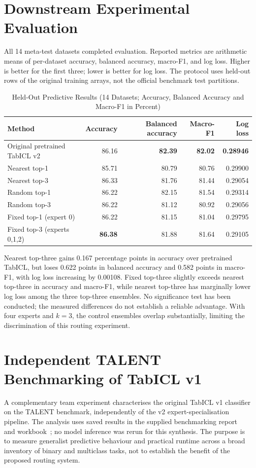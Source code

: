 \documentclass[conference]{IEEEtran}
\begin{document}
\section{Downstream Experimental Evaluation}
All 14 meta-test datasets completed evaluation. Reported metrics are arithmetic means of per-dataset accuracy, balanced accuracy, macro-F1, and log loss. Higher is better for the first three; lower is better for log loss. The protocol uses held-out rows of the original training arrays, not the official benchmark test partitions.
\begin{table}[t]
\caption{Held-Out Predictive Results (14 Datasets; Accuracy, Balanced Accuracy and Macro-F1 in Percent)}
\label{tab:results}
\centering\small
\begin{tabular}{lrrrr}\toprule
Method & Accuracy & Balanced accuracy & Macro-F1 & Log loss\\\midrule
Original pretrained TabICL v2 & 86.16 & \textbf{82.39} & \textbf{82.02} & \textbf{0.28946}\\
Nearest top-1 & 85.71 & 80.79 & 80.76 & 0.29900\\
Nearest top-3 & 86.33 & 81.76 & 81.44 & 0.29054\\
Random top-1 & 86.22 & 82.15 & 81.54 & 0.29314\\
Random top-3 & 86.22 & 81.12 & 80.92 & 0.29056\\
Fixed top-1 (expert 0) & 86.22 & 81.15 & 81.04 & 0.29795\\
Fixed top-3 (experts 0,1,2) & \textbf{86.38} & 81.88 & 81.64 & 0.29105\\\bottomrule
\end{tabular}
\end{table}
Nearest top-three gains 0.167 percentage points in accuracy over pretrained TabICL, but loses 0.622 points in balanced accuracy and 0.582 points in macro-F1, with log loss increasing by 0.00108. Fixed top-three slightly exceeds nearest top-three in accuracy and macro-F1, while nearest top-three has marginally lower log loss among the three top-three ensembles. No significance test has been conducted; the measured differences do not establish a reliable advantage. With four experts and $k=3$, the control ensembles overlap substantially, limiting the discrimination of this routing experiment.

\section{Independent TALENT Benchmarking of TabICL v1}
\label{sec:talent}
A complementary team experiment characterises the original TabICL v1 classifier on the TALENT benchmark, independently of the v2 expert-specialisation pipeline. The analysis uses saved results in the supplied benchmarking report~\cite{talentreport} and workbook~\cite{talentworkbook}; no model inference was rerun for this synthesis. The purpose is to measure generalist predictive behaviour and practical runtime across a broad inventory of binary and multiclass tasks, not to establish the benefit of the proposed routing system.
\end{document}
